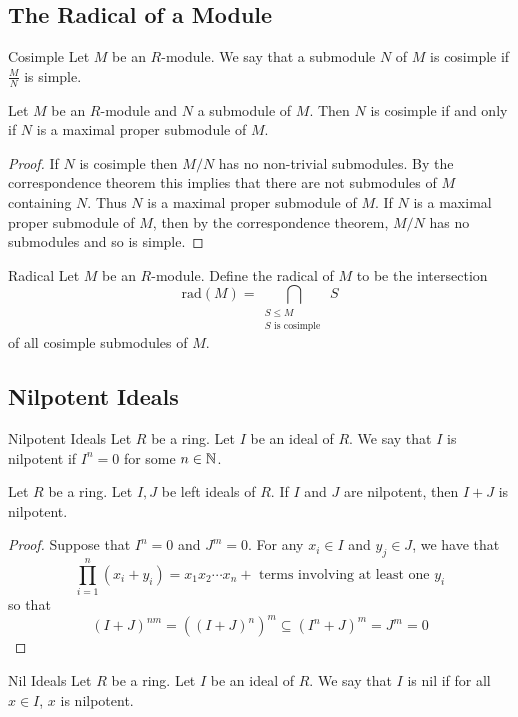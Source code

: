 \documentclass[a4paper]{article}
\begin{document}
\subsection{The Radical of a Module}
\begin{defn}{Cosimple}{} Let $M$ be an $R$-module. We say that a submodule $N$ of $M$ is cosimple if $\frac{M}{N}$ is simple. 
\end{defn}

\begin{lmm}{}{} Let $M$ be an $R$-module and $N$ a submodule of $M$. Then $N$ is cosimple if and only if $N$ is a maximal proper submodule of $M$. 
\begin{proof}
If $N$ is cosimple then $M/N$ has no non-trivial submodules. By the correspondence theorem this implies that there are not submodules of $M$ containing $N$. Thus $N$ is a maximal proper submodule of $M$. If $N$ is a maximal proper submodule of $M$, then by the correspondence theorem, $M/N$ has no submodules and so is simple. 
\end{proof}
\end{lmm}

\begin{defn}{Radical}{} Let $M$ be an $R$-module. Define the radical of $M$ to be the intersection $$\text{rad}(M)=\bigcap_{\substack{S\leq M\\S\text{ is cosimple }}}S$$ of all cosimple submodules of $M$. 
\end{defn}

\subsection{Nilpotent Ideals}
\begin{defn}{Nilpotent Ideals}{} Let $R$ be a ring. Let $I$ be an ideal of $R$. We say that $I$ is nilpotent if $I^n=0$ for some $n\in\mathbb{N}$. 
\end{defn}

\begin{prp}{}{} Let $R$ be a ring. Let $I,J$ be left ideals of $R$. If $I$ and $J$ are nilpotent, then $I+J$ is nilpotent. 
\begin{proof}
Suppose that $I^n=0$ and $J^m=0$. For any $x_i\in I$ and $y_j\in J$, we have that $$\prod_{i=1}^n(x_i+y_i)=x_1x_2\cdots x_n+\text{ terms involving at least one }y_i$$ so that $$(I+J)^{nm}=((I+J)^n)^m\subseteq(I^n+J)^m=J^m=0$$
\end{proof}
\end{prp}

\begin{defn}{Nil Ideals}{} Let $R$ be a ring. Let $I$ be an ideal of $R$. We say that $I$ is nil if for all $x\in I$, $x$ is nilpotent. 
\end{defn}
\end{document}
